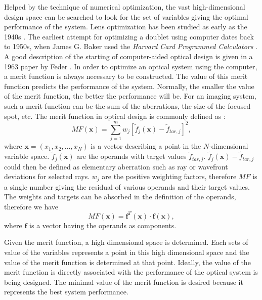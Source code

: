 Helped by the technique of numerical optimization, the vast high-dimensional design space can be searched to look for the set of variables giving the optimal performance of the system. Lens optimization has been studied as early as the 1940s \cite{wikilensdesign}. The earliest attempt for optimizing a doublet using computer dates back to 1950s, when James G. Baker used the \textit{Harvard Card Programmed Calculators} \cite{ThompsonOpticalDesignHistory}.  A good description of the starting of computer-aided optical design is given in a 1963 paper by Feder \cite{Feder:63}. In order to optimize an optical system using the computer, a merit function is always necessary to be constructed. The value of this merit function predicts the performance of the system. Normally, the smaller the value of the merit function, the better the performance will be. For an imaging system, such a merit function can be the sum of the aberrations, the size of the focused spot, etc.  The merit function in optical design is commonly defined as \cite{GrossHBOvol3}:
\setlength{\belowdisplayshortskip}{5pt}
\setlength{\abovedisplayshortskip}{5pt}
\begin{equation} \label{eq:MFdefi}
MF(\pmb{x})=\sum_{j=1}^{m} w_j [\tilde{f}_j(\pmb{x}) - \tilde{f}_{tar,j} ]^2,
\end{equation}
\noindent where $\textbf{x} = (x_1, x_2, ..., x_N)$ is a vector describing a point in the $N$-dimensional variable space. $\tilde{f}_j(\textbf{x})$ are the operands with target values $\tilde{f}_{tar,j}$. $\tilde{f}_j(\textbf{x}) - \tilde{f}_{tar,j}$ could then be defined as elementary aberration such as ray or wavefront deviations for selected rays. $w_j$ are the positive weighting factors, therefore $MF$ is a single number giving the residual of various operands and their target values. The weights and targets can be absorbed in the definition of the operands, therefore we have 
\begin{equation} \label{mf_oprand_vector}
MF(\pmb{x}) = \pmb{f}^{T}(\pmb{x})\cdot \pmb{f}(\pmb{x}),
\end{equation} where $\pmb{f}$ is a vector having the operands as components.

Given the merit function, a high dimensional space is determined. Each sets of value of the variables represents a point in this high dimensional space and the value of the merit function is determined at that point. Ideally, the value of the merit function is directly associated with the performance of the optical system is being designed. The minimal value of the merit function is desired because it represents the best system performance. 

